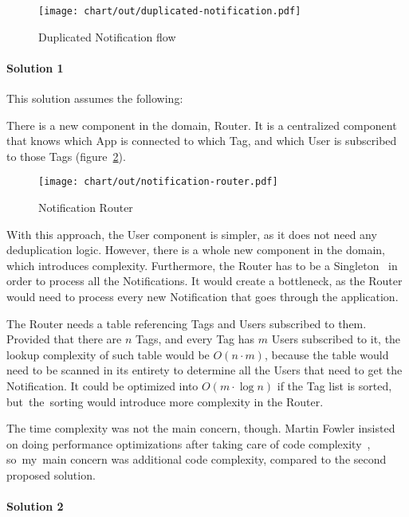 \begin{figure}[h]
  \centering
  \texttt{[image: chart/out/duplicated-notification.pdf]}
  \caption{Duplicated Notification flow}
  \label{fig:duplicated-notification}
\end{figure}

\paragraph*{Solution 1}\label{par:duplication-solution-1}

This solution assumes the following:

There is a new component in the domain, Router.
It is a centralized component
that knows which App is connected to which Tag,
and which User is subscribed to those Tags
(figure~\ref{fig:notification-router}).

\begin{figure}[h]
  \centering
  \texttt{[image: chart/out/notification-router.pdf]}
  \caption{Notification Router}
  \label{fig:notification-router}
\end{figure}

With this approach,
the User component is simpler,
as it does not need any deduplication logic.
However, there is a whole new component
in the domain, which introduces complexity.
Furthermore, the Router has to be
a Singleton~\cite{gamma_design_1994}
in order to process all the Notifications.
It would create a bottleneck,
as the Router would need to process every new Notification
that goes through the application.

The Router needs a table referencing
Tags and Users subscribed to them.
Provided that there are $n$ Tags,
and every Tag has $m$ Users subscribed to it,
the lookup complexity of such table
would be $O(n \cdot m)$,
because the table would need to be
scanned in its entirety to determine
all the Users that need to get the Notification.
It could be optimized into $O(m \cdot \log n)$
if the Tag list is sorted,
but~the~sorting would introduce
more complexity in the Router.

The time complexity was not the main concern, though.
Martin Fowler insisted on doing performance optimizations
after taking care of code complexity~\cite{fowler_refactoring_2019},
so~my~main concern was additional code complexity,
compared to the second proposed solution.

\paragraph*{Solution 2}\label{par:duplication-solution-2}


